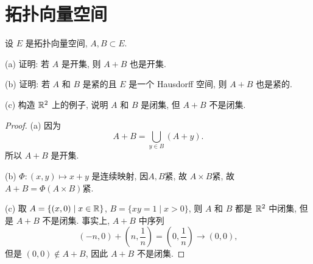 \chapter{拓扑向量空间}
\thispagestyle{empty}



\begin{exercise}[2]
    设 $E$ 是拓扑向量空间, $A,B\subset E$.

    (a) 证明: 若 $A$ 是开集, 则 $A+B$ 也是开集.

    (b) 证明: 若 $A$ 和 $B$ 是紧的且 $E$ 是一个 Hausdorff 空间, 则 $A+B$ 也是紧的.

    (c) 构造 $\mathbb{R}^2$ 上的例子, 说明 $A$ 和 $B$ 是闭集, 但 $A+B$ 不是闭集.
\end{exercise}

\begin{proof}
    (a) 因为
    \[A+B=\bigcup_{y\in B}(A+y).\]
    所以 $A+B$ 是开集.

    (b) $\varPhi:(x,y)\mapsto x+y$ 是连续映射, 因$A,B$紧, 故 $A\times B$紧, 故 $A+B=\varPhi(A\times B)$紧.

    (c) 取 $A=\{(x,0)\mid x\in\mathbb{R}\}$, $B=\{xy=1\mid x>0\}$,
    则 $A$ 和 $B$ 都是 $\mathbb{R}^2$ 中闭集, 但是 $A+B$ 不是闭集.
    事实上, $A+B$ 中序列
    \[(-n,0)+(n,\frac{1}{n})=(0,\frac{1}{n})\to (0,0),\]
    但是 $(0,0)\notin A+B$, 因此 $A+B$ 不是闭集.
\end{proof}



